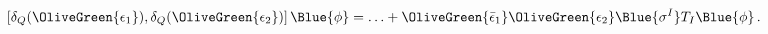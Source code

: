 \begin{equation}
  \left[ \delta_Q (\OliveGreen{\epsilon _1}),\delta_Q (\OliveGreen{\epsilon _2})\right] \Blue{\phi} =\ldots +
\OliveGreen{\bar \epsilon _1}\OliveGreen{\epsilon _2}\Blue{\sigma ^I}
T_I\Blue{\phi}\,.
 \label{QQextraT}
\end{equation}

